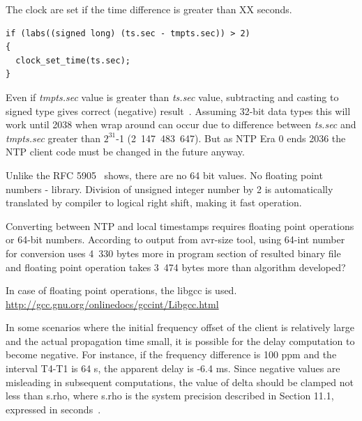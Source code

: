 The clock are set if the time difference is greater than XX seconds. %
\begin{lstlisting}
if (labs((signed long) (ts.sec - tmpts.sec)) > 2)
{
  clock_set_time(ts.sec);
}
\end{lstlisting}
Even if {\it{tmpts.sec}} value is greater than {\it{ts.sec}} value,
subtracting and casting to signed type gives correct (negative) result~\cite{c99}.
Assuming 32-bit data types this will work until 2038 when wrap around can occur due to difference
between {\it{ts.sec}} and {\it{tmpts.sec}} greater than $2^{31}$-1 (2~147~483~647).
But as NTP Era 0 ends 2036 the NTP client code must be changed in the future anyway.



Unlike the RFC 5905~\cite{rfc5905} shows, there are no 64 bit values. %
No floating point numbers - library.
Division of unsigned integer number by 2 is automatically translated by compiler to logical right shift,
making it fast operation.

Converting between NTP and local timestamps requires floating point operations or 64-bit numbers.
According to output from avr-size tool, using 64-int number for conversion
uses 4~330 bytes more in program section of resulted binary file 
and floating point operation takes 3~474 bytes more
than algorithm developed?

In case of floating point operations, the libgcc is used.
\url{http://gcc.gnu.org/onlinedocs/gccint/Libgcc.html}

%
In some scenarios where the initial frequency offset of the client is
  relatively large and the actual propagation time small, it is
   possible for the delay computation to become negative.  For instance,
   if the frequency difference is 100 ppm and the interval T4-T1 is 64
   s, the apparent delay is -6.4 ms.  Since negative values are
   misleading in subsequent computations, the value of delta should be
   clamped not less than s.rho, where s.rho is the system precision
   described in Section 11.1, expressed in seconds~\cite{rfc5905}.
%

